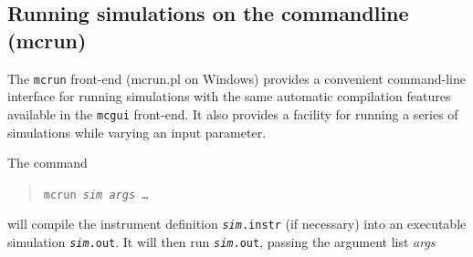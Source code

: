 \subsection{Running simulations on the commandline (mcrun)}
\label{s:mcrun}

The \verb+mcrun+ front-end (mcrun.pl on Windows) provides a convenient command-line
interface for running simulations with the same automatic compilation
features available in the \verb+mcgui+ front-end. It also provides a
facility for running a series of simulations while varying an input
parameter.

The command
\begin{quote}
  \texttt{mcrun {\it sim} {\it args\/} \ldots}
\end{quote}
will compile the instrument definition \texttt{{\it sim}.instr} (if
necessary) into an executable simulation \texttt{{\it sim}.out}. It
will then run \texttt{{\it sim}.out}, passing the argument list {\it
  args}

